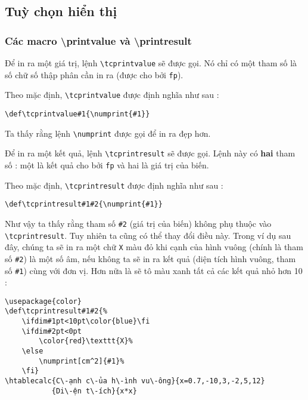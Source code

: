 \documentclass[a4paper,10pt]{article}
\newcommand\verbinline{\lstinline[breaklines=false,basicstyle=\normalsize\ttfamily]}
\newcommand\mywidth{0.85\linewidth}
\begin{document}
\subsection{Tuỳ chọn hiển thị}
\subsubsection{Các macro {\ttfamily\textbackslash printvalue} và {\ttfamily\textbackslash printresult}}\label{persoaffichage}
Để in ra một giá trị, lệnh \verbinline|\tcprintvalue| sẽ được gọi. Nó chỉ có một tham số là số chữ số thập phân cần in ra (được cho bởi \verb|fp|).

Theo mặc định, \verbinline|\tcprintvalue| được định nghĩa như sau :\par\nobreak\smallskip
\hfill\verbinline|\def\tcprintvalue#1{\numprint{#1}}|\hfill{}
\smallskip

Ta thấy rằng lệnh \verb|\numprint| được gọi để in ra đẹp hơn.\bigskip

Để in ra một kết quả, lệnh \verbinline|\tcprintresult| sẽ được gọi. Lệnh này có \textbf{hai} tham số : một là kết quả cho bởi \verb|fp| và hai là giá trị của biến.

Theo mặc định, \verbinline|\tcprintresult| được định nghĩa như sau :\par\nobreak\smallskip
\hfill\verbinline|\def\tcprintresult#1#2{\numprint{#1}}|\hfill{}
\smallskip

Như vậy ta thấy rằng tham số \verb|#2| (giá trị của biến) không phụ thuộc vào \verbinline|\tcprintresult|. Tuy nhiên ta cũng có thể thay đổi điều này. Trong ví dụ sau đây, chúng ta sẽ in ra một chữ \verb|X| màu đỏ khi cạnh của hình vuông (chính là tham số \verb|#2|) là một số âm, nếu không ta sẽ in ra kết quả (diện tích hình vuông, tham số \verb|#1|) cùng với đơn vị. Hơn nữa là sẽ tô màu xanh tất cả các kết quả nhỏ hơn 10 :\par\nobreak
\begin{center}
\begin{minipage}{\mywidth}
\begin{lstlisting}
\usepackage{color}
\def\tcprintresult#1#2{%
	\ifdim#1pt<10pt\color{blue}\fi
	\ifdim#2pt<0pt
		\color{red}\texttt{X}%
	\else
		\numprint[cm^2]{#1}%
	\fi}
\htablecalc{C\-ạnh c\-ủa h\-ình vu\-ông}{x=0.7,-10,3,-2,5,12}
           {Di\-ện t\-ích}{x*x}
\end{lstlisting}
\end{minipage}

\def\tcprintresult#1#2{%
	\ifdim#1pt<10pt\color{blue}\fi
	\ifdim#2pt<0pt
		\color{red}\texttt{X}%
	\else
		\numprint[cm^2]{#1}%
	\fi}
\end{center}
\end{document}

